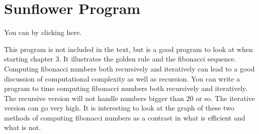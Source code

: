 \documentclass[letterpaper,10pt,english]{sphinxmanual}
\begin{document}
\begin{sphinxVerbatim}[commandchars=\\\{\},numbers=left,firstnumber=1,stepnumber=1]
    
       
        
 
      
      

       
    
    

   
        
\end{sphinxVerbatim}


\section{Sunflower Program}
\label{\detokenize{chap3/chap3:sunflower-program}}
You can  by clicking here.

This program is not included in the text, but is a good program to look at when starting chapter 3. It illustrates the golden rule and the
fibonacci sequence. Computing fibonacci numbers both recursively and iteratively can lead to a good discussion of computational complexity as well as recursion. You can write a program to time computing fibonacci numbers both recursively and iteratively. The recursive version will not handle numbers bigger than 20 or so. The iterative version can go very high. It is interesting to look at the graph of these two methods of computing fibonacci numbers as a contrast in what is efficient and what is not.
\end{document}
